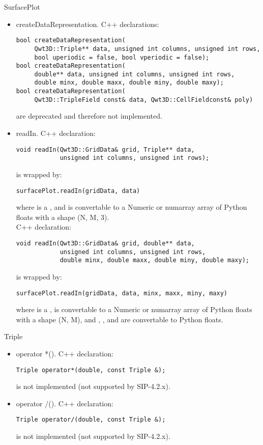 \documentclass{manual}
\begin{document}
\begin{classdesc*}{SurfacePlot}
\begin{itemize}
  \item{createDataRepresentation}. C++ declarations:
\begin{verbatim}
bool createDataRepresentation(
     Qwt3D::Triple** data, unsigned int columns, unsigned int rows,
     bool uperiodic = false, bool vperiodic = false);
bool createDataRepresentation(
     double** data, unsigned int columns, unsigned int rows,
     double minx, double maxx, double miny, double maxy);
bool createDataRepresentation(
     Qwt3D::TripleField const& data, Qwt3D::CellFieldconst& poly)
\end{verbatim}
    are deprecated and therefore not implemented.
  \item{readIn}. C++ declaration:
\begin{verbatim}
void readIn(Qwt3D::GridData& grid, Triple** data,
            unsigned int columns, unsigned int rows);
\end{verbatim}
    is wrapped by:
\begin{verbatim}
surfacePlot.readIn(gridData, data) 
\end{verbatim}
    where  is a , and  is convertable
    to a Numeric or numarray array of Python floats with a shape (N, M, 3).\\
    C++ declaration:
\begin{verbatim}
void readIn(Qwt3D::GridData& grid, double** data,
            unsigned int columns, unsigned int rows,
            double minx, double maxx, double miny, double maxy);
\end{verbatim}
    is wrapped by:
\begin{verbatim}
surfacePlot.readIn(gridData, data, minx, maxx, miny, maxy)
\end{verbatim}
    where  is a ,  is convertable to
    a Numeric or numarray array of Python floats with a shape (N, M), and
    , ,  and  are convertable to Python
    floats.
  \end{itemize}
\end{classdesc*}

\begin{classdesc*}{Triple}
  \begin{itemize}
  \item{operator *()}. C++ declaration:
\begin{verbatim}
Triple operator*(double, const Triple &);
\end{verbatim}
    is not implemented (not supported by SIP-4.2.x).
  \item{operator /()}. C++ declaration:
\begin{verbatim}
Triple operator/(double, const Triple &);
\end{verbatim}
    is not implemented (not supported by SIP-4.2.x).
  \end{itemize}
\end{classdesc*}
\end{document}
